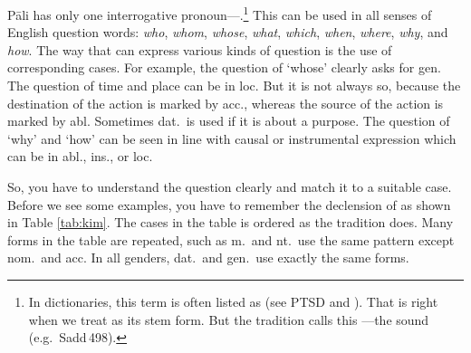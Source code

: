 P\=ali has only one interrogative pronoun---.\footnote{In dictionaries, this term is often listed as  (see PTSD and \citealp[pp.~600--3]{cone:dict1}). That is right when we treat  as its stem form. But the tradition calls this ---the sound  (e.g.\ Sadd\,498).} This can be used in all senses of English question words: \emph{who}, \emph{whom}, \emph{whose}, \emph{what}, \emph{which}, \emph{when}, \emph{where}, \emph{why}, and \emph{how}. The way that  can express various kinds of question is the use of corresponding cases. For example, the question of `whose' clearly asks for gen. The question of time and place can be in loc. But it is not always so, because the destination of the action is marked by acc., whereas the source of the action is marked by abl. Sometimes dat.\ is used if it is about a purpose. The question of `why' and `how' can be seen in line with causal or instrumental expression which can be in abl., ins., or loc.

So, you have to understand the question clearly and match it to a suitable case. Before we see some examples, you have to remember the declension of  as shown in Table \ref{tab:kim}. The cases in the table is ordered as the tradition does. Many forms in the table are repeated, such as m.\ and nt.\ use the same pattern except nom.\ and acc. In all genders, dat.\ and gen.\ use exactly the same forms.


